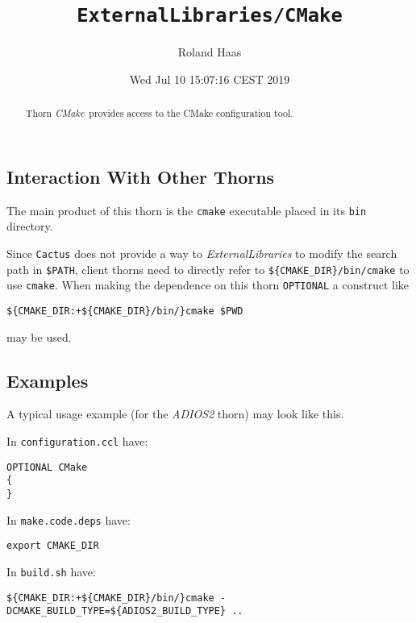 \documentclass{article}
\begin{document}
\title{\tt ExternalLibraries/CMake}
\author{Roland Haas}
\date{ Wed Jul 10 15:07:16 CEST 2019 }

\maketitle


\ifx\ThisThorn\undefined
\newcommand{\ThisThorn}{{\it CMake}}
\else
\renewcommand{\ThisThorn}{{\it CMake}}
\fi

\begin{abstract}
Thorn \ThisThorn\ provides access to the CMake configuration tool.
\end{abstract}

\subsection{Interaction With Other Thorns}
The main product of this thorn is the \texttt{cmake} executable placed in its
\texttt{bin} directory.

Since \texttt{Cactus} does not provide a way to \textit{ExternalLibraries} to
modify the search path in \verb|$PATH|, client thorns need to directly refer
to \verb|${CMAKE_DIR}/bin/cmake| to use \texttt{cmake}. When making the
dependence on this thorn \verb|OPTIONAL| a construct like

\begin{verbatim}
${CMAKE_DIR:+${CMAKE_DIR}/bin/}cmake $PWD
\end{verbatim}

may be used.

\subsection{Examples}

A typical usage example (for the \textit{ADIOS2} thorn) may look like this.

In \texttt{configuration.ccl} have:

\begin{verbatim}
OPTIONAL CMake
{
}
\end{verbatim}

In \texttt{make.code.deps} have:

\begin{verbatim}
export CMAKE_DIR
\end{verbatim}

In \texttt{build.sh} have:

\begin{verbatim}
${CMAKE_DIR:+${CMAKE_DIR}/bin/}cmake -DCMAKE_BUILD_TYPE=${ADIOS2_BUILD_TYPE} ..
\end{verbatim}

\end{document}
